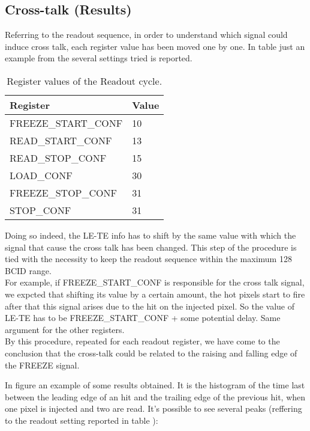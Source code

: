 \subsection{Cross-talk (Results)}

Referring to the readout sequence, in order to understand which signal could induce cross talk, each register value has been moved one by one.
In table  just an example from the several settings tried is reported.

\begin{table}[h!]
\centering
\begin{tabular}{>{} C{5cm}|C{1.7cm}}
Register & Value \\
\hline
\textsc{FREEZE\_START\_CONF} & 10\\[0.3ex]
\hline
\textsc{READ\_START\_CONF}& 13 \\[0.3ex]
\hline
\textsc{READ\_STOP\_CONF} & 15 \\[0.3ex]
\hline
\textsc{LOAD\_CONF} & 30 \\[0.3ex]
\hline
\textsc{FREEZE\_STOP\_CONF} & 31\\[0.3ex]
\hline
\textsc{STOP\_CONF} & 31\\[0.3ex]
\hline
\end{tabular}
\caption{Register values of the Readout cycle.}
\label{tab:ro_registers}
\end{table}

Doing so indeed, the LE-TE info has to shift by the same value with which the signal that cause the cross talk has been changed. This step of the procedure is tied with the necessity to keep the readout sequence within the maximum 128 BCID range.\\

For example, if \textsc{FREEZE\_START\_CONF} is responsible for the cross talk signal, we expcted that shifting its value by a certain amount, the hot pixels start to fire after that this signal arises due to the hit on the injected pixel. So the value of LE-TE has to be \textsc{FREEZE\_START\_CONF} + some potential delay. Same argument for the other registers. \\

By this procedure, repeated for each readout register, we have come to the conclusion that the cross-talk could be related to the raising and falling edge of the \textsc{FREEZE} signal.

In figure  an example of some results obtained. It is the histogram of the time last between the leading edge of an hit and the trailing edge of the previous hit, when one pixel is injected and two are read. It's possible to see several peaks (reffering to the readout setting reported in table ):

